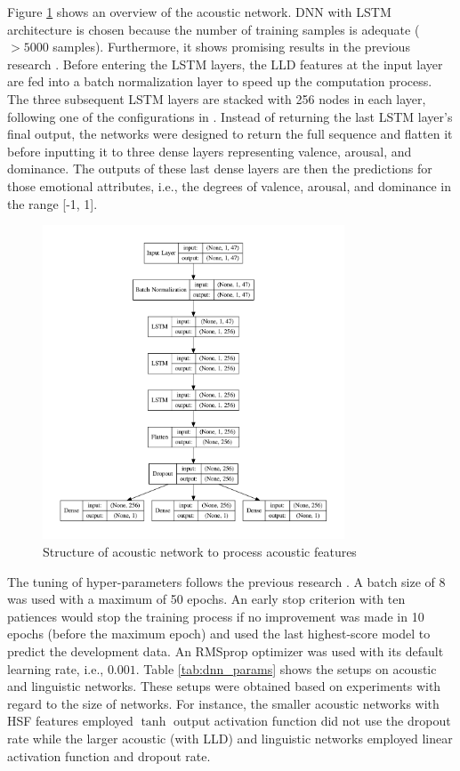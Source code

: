 Figure \ref{fig:acoustic_model} shows an overview of the acoustic network. DNN
with LSTM architecture is chosen because the number of training samples is
adequate ($> 5000$ samples). Furthermore, it shows promising results in the
previous research \cite{Schmitt2018}.  Before entering the LSTM layers, the LLD
features at the input layer are fed into a batch normalization layer to speed
up the computation process. The three subsequent LSTM layers are stacked with
256 nodes in each layer, following one of the configurations in
\cite{Abdelwahab2018}. Instead of returning the last LSTM layer's final output,
the networks were designed to return the full sequence and flatten it before
inputting it to three dense layers representing valence, arousal, and
dominance. The outputs of these last dense layers are then the predictions for
those emotional attributes, i.e., the degrees of valence, arousal, and
dominance in the range [-1, 1]. 

\begin{figure}[htpb]
    \centering
    \includegraphics[width=0.8\textwidth]{../fig/model_acoustic.pdf}
    \caption{Structure of acoustic network to process acoustic features}
    \label{fig:acoustic_model}
    \end{figure}

The tuning of hyper-parameters follows the previous research
\cite{Atmaja2019b,Atmaja2020d}. A batch size of 8 was used with a maximum of 50
epochs. An early stop criterion with ten patiences would stop the training
process if no improvement was made in 10 epochs (before the maximum epoch) and
used the last highest-score model to predict the development data. An RMSprop
optimizer was used with its default learning rate, i.e., $0.001$. Table
\ref{tab:dnn_params} shows the setups on acoustic and linguistic networks. These
setups were obtained based on experiments with regard to the size of networks.
For instance, the smaller acoustic networks with HSF features employed $\tanh$
output activation function did not use the dropout rate while the larger
acoustic (with LLD) and linguistic networks employed linear activation
function and dropout rate.

